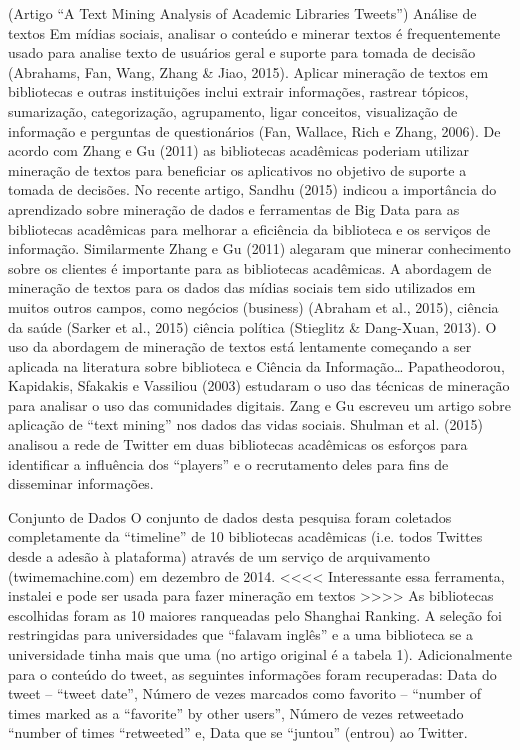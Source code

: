 (Artigo “A Text Mining Analysis of Academic Libraries Tweets”)
Análise de textos
Em mídias sociais, analisar o conteúdo e minerar textos é frequentemente usado para analise texto de usuários geral e suporte para tomada de decisão (Abrahams, Fan, Wang, Zhang \& Jiao, 2015). Aplicar mineração de textos em bibliotecas e outras instituições inclui extrair informações, rastrear tópicos, sumarização, categorização, agrupamento, ligar conceitos, visualização de informação e perguntas de questionários (Fan, Wallace, Rich e Zhang, 2006). De acordo com Zhang e Gu (2011) as bibliotecas acadêmicas poderiam utilizar mineração de textos para beneficiar os aplicativos no objetivo de suporte a tomada de decisões.
No recente artigo, Sandhu (2015) indicou a importância do aprendizado sobre mineração de dados e  ferramentas de Big Data para as bibliotecas acadêmicas para melhorar a eficiência da biblioteca e os serviços de informação. Similarmente Zhang e Gu (2011) alegaram que  minerar conhecimento sobre os clientes é importante para as bibliotecas acadêmicas. 
A abordagem de mineração de textos para os dados das mídias sociais tem sido utilizados em muitos outros campos, como negócios (business) (Abraham et al., 2015), ciência da saúde (Sarker et al., 2015) ciência política (Stieglitz \& Dang-Xuan, 2013).
O uso da abordagem de mineração de textos está lentamente começando a ser aplicada na literatura sobre biblioteca e Ciência da Informação…
Papatheodorou, Kapidakis, Sfakakis e Vassiliou (2003) estudaram o uso das técnicas de mineração para analisar o uso das comunidades digitais.
Zang e Gu escreveu um artigo sobre aplicação de “text mining” nos dados das vidas sociais.
Shulman et al. (2015) analisou a rede de Twitter em duas bibliotecas acadêmicas os esforços para identificar a influência dos “players” e o recrutamento deles para fins de disseminar informações.


Conjunto de Dados
O conjunto de dados desta pesquisa foram coletados completamente da “timeline” de 10 bibliotecas acadêmicas (i.e. todos Twittes desde a adesão à plataforma) através de um serviço de arquivamento (twimemachine.com) em dezembro de 2014. 
<<<<  Interessante essa ferramenta, instalei e pode ser usada para fazer mineração em textos  >>>>
As bibliotecas escolhidas foram as 10 maiores ranqueadas pelo Shanghai Ranking. A seleção foi restringidas para universidades que “falavam inglês” e a uma biblioteca se a universidade tinha mais que uma (no artigo original é a tabela 1). Adicionalmente para o conteúdo do tweet, as seguintes informações foram recuperadas: 
Data do tweet – “tweet date”,
Número de vezes marcados como favorito – “number of times marked as a “favorite” by other users”, 
Número de vezes retweetado “number of times “retweeted” e, 
Data que se “juntou” (entrou) ao Twitter.


